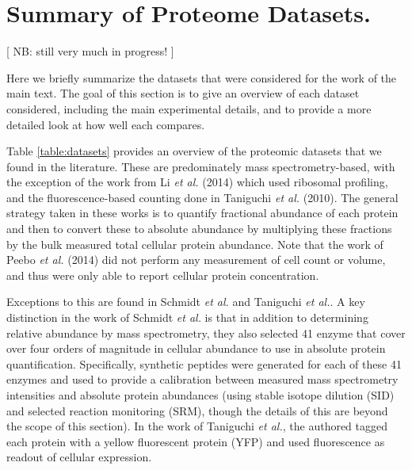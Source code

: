 

\section{Summary of Proteome Datasets.}

[ NB: still very much in progress! ]

Here we briefly summarize the datasets that were considered for the work of the main
text. The goal of this section is to give an overview of each dataset
considered, including the main experimental details, and to provide a more
detailed look at how well each compares.

Table \ref{table:datasets} provides an overview of the proteomic datasets that
we found in the literature. These are predominately mass spectrometry-based,
with the exception of the work from Li \textit{et al.} (2014) which used ribosomal
profiling, and the fluorescence-based counting done in Taniguchi \textit{et al.}
(2010). The general strategy taken in these works is to quantify fractional
abundance of each protein and then to convert these to absolute abundance by
multiplying these fractions by the bulk measured total cellular protein
abundance. Note that the work of Peebo \textit{et al.} (2014) did not perform any
measurement of cell count or volume, and thus were only able to report cellular
protein concentration.

Exceptions to this are found in Schmidt \textit{et al.} and Taniguchi \textit{et al.}.
A key distinction in the work of Schmidt \textit{et al.} is that in addition to
determining relative abundance by mass spectrometry, they also selected 41
enzyme that cover over four orders of magnitude in cellular abundance to use in
absolute protein quantification. Specifically, synthetic peptides were generated
for each of these 41 enzymes and used to provide a calibration between measured
mass spectrometry intensities and absolute protein abundances (using stable
isotope dilution (SID) and selected reaction monitoring (SRM), though the
details of this are beyond the scope of this section). In the work of Taniguchi
\textit{et al.},  the authored tagged each protein with a  yellow fluorescent
protein (YFP) and used fluorescence as readout of cellular expression.


